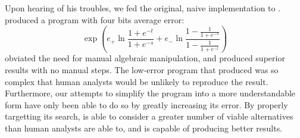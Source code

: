 \documentclass[paper.tex]{subfiles}
\begin{document}
Upon hearing of his troubles, we fed the original, naive
implementation to \casio.
\casio produced a program with four bits average error:
\begin{equation*}
  \operatorname{exp}\left(e_+\ln{\frac{1+e^{-t}}{1+e^{-s}}} +
     e_-\ln{\frac{1-\frac{1}{1+e^{-s}}}
                 {1-\frac{1}{1+e^{-t}}}}\right)
\end{equation*}
\casio obviated the need for manual algebraic manipulation, and
produced superior results with no manual steps.
The low-error program that \casio produced was so complex that human
analysts would be unlikely to reproduce the result.  Furthermore, our
attempts to simplify the program into a more understandable form have only been able to do so by greatly increasing
its error.  By properly targetting its search, \casio is able to
consider a greater number of viable alternatives than human analysts
are able to, and is capable of producing better results.
\end{document}
